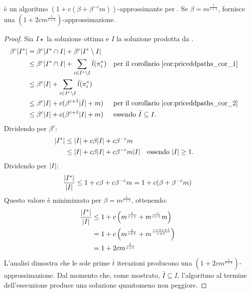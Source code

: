 \begin{theorem}\label{thm:priceddpaths_approx}
	\PricedDisjointPaths è un algoritmo $(1+c(\beta+\beta^{-c}m))$-approssimante per \DisjointPaths.
	Se $\beta=m^{\frac{1}{c+1}}$, \PricedDisjointPaths fornisce una $(1+2cm^{\frac{1}{c+1}})$-approssimazione.
\end{theorem}
\begin{proof}
	Sia $I\star$ la soluzione ottima e $I$ la soluzione prodotta da \PricedDisjointPaths.
	\begin{align*}
		\beta^c| I^* | & = \beta^c| I^*\cap I |+\beta^c| I^*\setminus I |                                                                                  \\
		                     & \leq \beta^c| I^*\cap I | + \sum_{i\in I^*\setminus I} \bar l(\pi^*_i) &  & \text{per il corollario \ref{cor:priceddpaths_cor_1}} \\
		                     & \leq \beta^c| I | + \sum_{i\in I^*\setminus I} \bar l(\pi^*_i)                                                                        \\
		                     & \leq \beta^c| I | + c(\beta^{c+1}| \bar I |+m)                                &  & \text{per il corollario \ref{cor:priceddpaths_cor_2}} \\
		                     & \leq \beta^c| I | + c(\beta^{c+1}| I |+m)                                      &  & \text{essendo $\bar I\subseteq I$} \text.
	\end{align*}
	Dividendo per $\beta^c$:
	\begin{align*}
		| I^* | & \leq | I |+c\beta| I |+c\beta^{-c}m                                                   \\
		              & \leq | I |+c\beta| I |+c\beta^{-c}m| I | &  & \text{essendo $| I |\geq 1$} \text.
	\end{align*}
	Dividendo per $| I |$:
	\begin{equation*}
		\frac{| I^* |}{| I |} \leq 1+c\beta+c\beta^{-c}m = 1+c(\beta+\beta^{-c}m)
	\end{equation*}
	Questo valore è minimizzato per $\beta=m^{\frac{1}{c+1}}$, ottenendo:
	\begin{align*}
		\frac{| I^* |}{| I |} & \leq 1+c\left(m^{\frac{1}{c+1}}+m^{\frac{-c}{c+1}}m\right) \\
		                           & = 1+c\left(m^{\frac{1}{c+1}}+m^{\frac{-c+c+1}{c+1}}\right) \\
		                           & = 1+2cm^{\frac{1}{c+1}}
	\end{align*}
	L'analisi dimostra che le sole prime $\bar t$ iterazioni producono una $(1+2cm^{\frac{1}{c+1}})$-approssimazione. Dal momento che, come mostrato, $\bar I\subseteq I$, l'algoritmo al termine dell'esecuzione produce una soluzione quantomeno non peggiore.
\end{proof}




